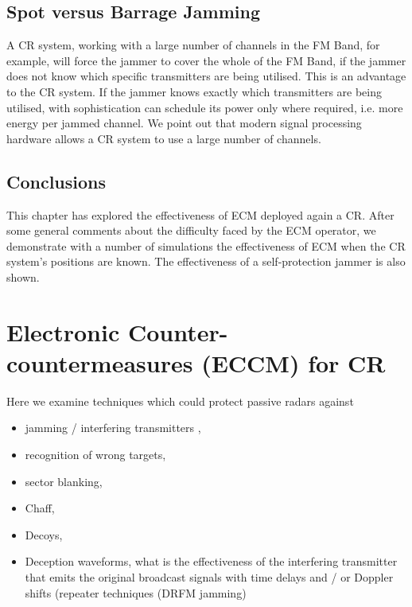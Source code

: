 \documentclass[english, 12pt]{report}
\begin{document}
\clearpage


\section{Spot versus Barrage Jamming}

A CR system, working with a large number of channels in the FM Band, for example, will force the jammer to cover the whole of the FM Band, if the jammer does not know which specific transmitters are being utilised. This is an advantage to the CR system. If the jammer knows exactly which transmitters are being utilised, with sophistication can schedule its power only where required, i.e. more energy per jammed channel. We point out that modern signal processing hardware allows a CR system to use a large number of channels.

\section{Conclusions}

This chapter has explored the effectiveness of ECM deployed again a CR. After some general comments about the difficulty faced by the ECM operator, we demonstrate with a number of simulations the effectiveness of ECM when the CR system's positions are known. The effectiveness of a self-protection jammer is also shown.

\chapter{Electronic Counter-countermeasures (ECCM) for CR}

 Here we examine techniques which could protect passive radars against
 
 \begin{itemize}
\item  jamming / interfering transmitters ,
\item recognition of wrong targets,
\item sector blanking,
\item Chaff,
\item Decoys,
\item Deception waveforms, what is the effectiveness of the interfering transmitter that emits the original broadcast signals with time delays and / or Doppler shifts (repeater techniques (DRFM jamming)
\end{itemize}
\end{document}
